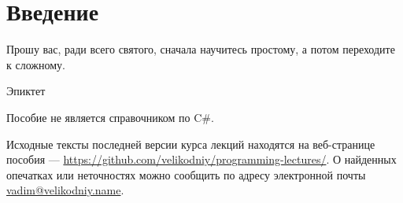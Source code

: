 \chapter*{Введение}

\epigraph{Прошу вас, ради всего святого, сначала научитесь простому, а
потом переходите к сложному.}{Эпиктет}

\lipsum[1-7]

Пособие не является справочником по C\#.

Исходные тексты последней версии курса лекций находятся на
веб-странице пособия —
\url{https://github.com/velikodniy/programming-lectures/}. О найденных
опечатках или неточностях можно сообщить по адресу электронной почты
\href{mailto:vadim@veikodniy.name}{vadim@velikodniy.name}.
